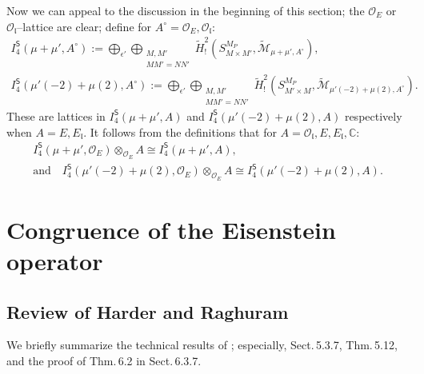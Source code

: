 \documentclass[11pt]{amsart}
\begin{document}
\smallskip
Now we can appeal to the discussion in the beginning of this section; the $\mathcal{O}_E$ or $\mathcal{O}_\mathfrak{l}$--lattice are clear; 
define for ${A^\circ} = \mathcal{O}_E, \mathcal{O}_\mathfrak{l}$:
\begin{gather*}
	I_4^\mathsf{S}(\mu+\mu',A^\circ) := \bigoplus_{\epsilon'}\bigoplus_{\substack{M,M' \\ MM' = NN'}} \tilde{H}_{!}^2(S^{M_P}_{M\times M'}, \widetilde{\mathcal{M}}_{\mu+\mu', A^\circ}),\\
	I_4^\mathsf{S}(\mu'(-2) + \mu(2),A^\circ) := \bigoplus_{\epsilon'}\bigoplus_{\substack{M,M' \\ MM' = NN'}} \tilde{H}_{!}^2(S^{M_P}_{M'\times M}, \widetilde{\mathcal{M}}_{\mu'(-2) + \mu(2), A^\circ}).
\end{gather*}
These are lattices in $I_4^\mathsf{S}(\mu+\mu',A)$ and $I_4^\mathsf{S}(\mu'(-2) + \mu(2),A)$ respectively when $A = E, E_\mathfrak{l}.$ 
It follows from the definitions that for $A = \mathcal{O}_\mathfrak{l}, E, E_\mathfrak{l}, \mathbb{C}$: 
\begin{multline*}
	I_4^\mathsf{S}(\mu + \mu', \mathcal{O}_E) \otimes_{\mathcal{O}_E} A \cong I_4^\mathsf{S}(\mu+\mu', A), \quad \\ \text{and} \quad 
	I_4^\mathsf{S}(\mu'(-2) + \mu(2),\mathcal{O}_E)\otimes_{\mathcal{O}_E} A \cong I_4^\mathsf{S}(\mu'(-2) + \mu(2), A).
\end{multline*}


\medskip
\section{Congruence of the Eisenstein operator}
	
\subsection{Review of Harder and Raghuram \cite{harder-raghuram}}
We briefly summarize the technical results of \cite{harder-raghuram}; especially, Sect.\,5.3.7, Thm.\,5.12, and the proof of Thm.\,6.2 in Sect.\,6.3.7.

\smallskip
\end{document}
